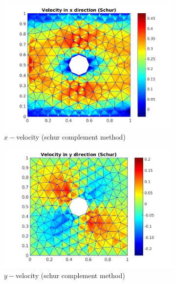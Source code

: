 \documentclass[a4paper]{book}
\begin{document}
\begin{figure}[H]
\begin{subfigure}{0.5\textwidth}	
  \includegraphics[width=\linewidth]{cylinder_schur_vx.jpg}
  \caption{$x-$velocity (schur complement method)}
  \label{x_vel_stoke_schur}
\end{subfigure}
\begin{subfigure}{0.5\textwidth}	
  \includegraphics[width=\linewidth]{cylinder_schur_vy.jpg}
  \caption{$y-$velocity (schur complement method)}
  \label{y_vel_stoke_schur}
\end{subfigure}
\begin{subfigure}{\textwidth}	

\end{subfigure}
\end{figure}
\end{document}
